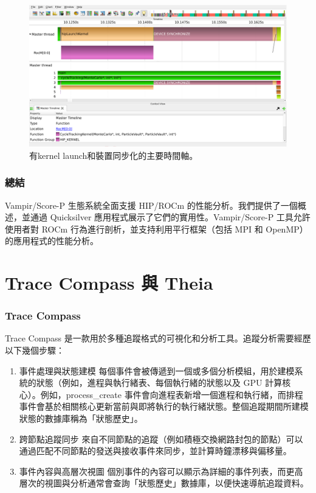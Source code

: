 \begin{figure}
    \centering
    \includegraphics[width=0.9\linewidth]{FileAusiliari/Screenshots/Figure13-12.png}
    \caption{有kernel launch和裝置同步化的主要時間軸。}
    \label{fig:PAPI12}
\end{figure}

\subsubsection{總結}
Vampir/Score-P 生態系統全面支援 HIP/ROCm 的性能分析。我們提供了一個概述，並通過 Quicksilver 應用程式展示了它們的實用性。Vampir/Score-P 工具允許使用者對 ROCm 行為進行剖析，並支持利用平行框架（包括 MPI 和 OpenMP）的應用程式的性能分析。


\section{Trace Compass 與 Theia}
\subsubsection{Trace Compass}

Trace Compass 是一款用於多種追蹤格式的可視化和分析工具。追蹤分析需要經歷以下幾個步驟：

\begin{enumerate}
    \item 事件處理與狀態建模
每個事件會被傳遞到一個或多個分析模組，用於建模系統的狀態（例如，進程與執行緒表、每個執行緒的狀態以及 GPU 計算核心）。例如，process\_create 事件會向進程表新增一個進程和執行緒，而排程事件會基於相關核心更新當前與即將執行的執行緒狀態。整個追蹤期間所建模狀態的數據庫稱為「狀態歷史」。
    \item 跨節點追蹤同步
來自不同節點的追蹤（例如積極交換網路封包的節點）可以通過匹配不同節點的發送與接收事件來同步，並計算時鐘漂移與偏移量。
    \item 事件內容與高層次視圖
個別事件的內容可以顯示為詳細的事件列表，而更高層次的視圖與分析通常會查詢「狀態歷史」數據庫，以便快速導航追蹤資料。
    
\end{enumerate}

